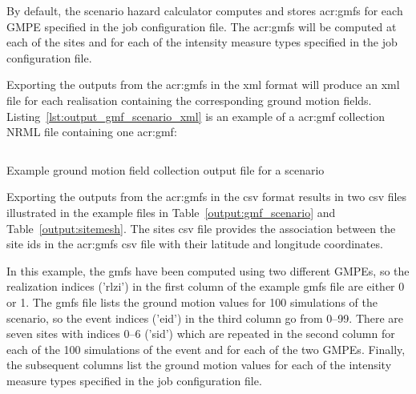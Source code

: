 By default, the scenario hazard calculator computes and stores
\glspl{acr:gmf} for each GMPE specified in the job configuration file. The
\glspl{acr:gmf} will be computed at each of the sites and for each of the
intensity measure types specified in the job configuration file.

Exporting the outputs from the \glspl{acr:gmf} in the xml format will produce
an xml file for each realisation containing the corresponding ground motion
fields. Listing~\ref{lst:output_gmf_scenario_xml} is an example of a \gls{acr:gmf}
collection NRML file containing one \gls{acr:gmf}:

\begin{listing}[htbp]
  \inputminted[firstline=1,firstnumber=1,fontsize=\footnotesize,frame=single,linenos,bgcolor=lightgray]{xml}{oqum/hazard/verbatim/output_gmf_scenario.xml}
  \caption{Example ground motion field collection output file for a scenario}
  \label{lst:output_gmf_scenario_xml}
\end{listing}

Exporting the outputs from the \glspl{acr:gmf} in the csv format results in
two csv files illustrated in the example files in
Table~\ref{output:gmf_scenario} and Table~\ref{output:sitemesh}. The sites csv
file provides the association between the site ids in the \glspl{acr:gmf} csv
file with their latitude and longitude coordinates.



In this example, the gmfs have been computed using two different GMPEs, so the
realization indices ('rlzi') in the first column of the example gmfs file are
either 0 or 1. The gmfs file lists the ground motion values for 100
simulations of the scenario, so the event indices ('eid') in the third column
go from 0–99. There are seven sites with indices 0–6 ('sid') which are
repeated in the second column for each of the 100 simulations of the event and
for each of the two GMPEs. Finally, the subsequent columns list the ground
motion values for each of the intensity measure types specified in the job
configuration file.



